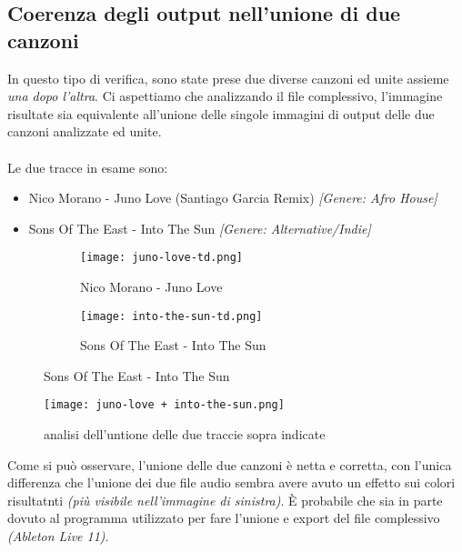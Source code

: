\documentclass{article}
\begin{document}
\subsection{Coerenza degli output nell'unione di due canzoni}
In questo tipo di verifica, sono state prese due diverse canzoni ed unite
assieme \textit{una dopo l'altra}. Ci aspettiamo che analizzando il file
complessivo, l'immagine risultate sia equivalente all'unione delle singole
immagini di output delle due canzoni analizzate ed unite.\\ \\ Le due tracce in
esame sono:
\begin{itemize}
    \item Nico Morano - Juno Love (Santiago Garcia Remix) \textit{[Genere: Afro House]}
    \item Sons Of The East - Into The Sun \textit{[Genere: Alternative/Indie]}
\end{itemize}
\begin{figure}[h]
    \centering
    \begin{subfigure}{0.5\linewidth}
        \centering
        \texttt{[image: juno-love-td.png]}
        \caption{Nico Morano - Juno Love}
        \label{fig:juno-love-td}
    \end{subfigure}%
    \begin{subfigure}{0.5\linewidth}
        \centering
        \texttt{[image: into-the-sun-td.png]}
        \caption{Sons Of The East - Into The Sun}
        \label{fig:into-the-sun-td-verifica}
    \end{subfigure}
    \label{fig:analisi-unione}
\end{figure}
\begin{figure}[h]
    \centering
    \texttt{[image: juno-love + into-the-sun.png]}
    \caption{analisi dell'untione delle due traccie sopra indicate}
    \label{fig:juno-love-into-th-sun}
\end{figure}
Come si può osservare, l'unione delle due canzoni è netta e corretta, con l'unica differenza che l'unione dei due file audio sembra avere avuto un effetto sui colori risultatnti \textit{(più visibile nell'immagine di sinistra)}. È probabile che sia in parte dovuto al programma utilizzato per fare l'unione e export del file complessivo \textit{(Ableton Live 11)}.

\newpage
\end{document}
